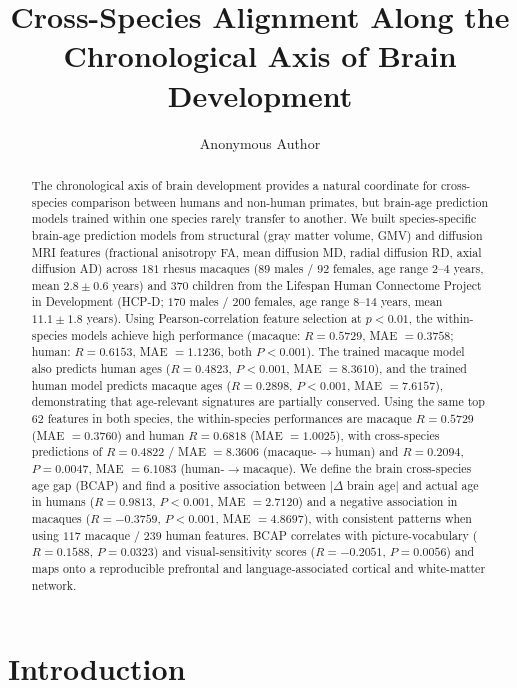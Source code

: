 \documentclass[11pt]{article}
\title{Cross-Species Alignment Along the Chronological Axis of Brain Development}
\author[1]{Anonymous Author}
\affil[1]{Anonymous Institution}
\date{}
\begin{document}
\maketitle

\begin{abstract}
The chronological axis of brain development provides a natural coordinate for cross-species comparison between humans and non-human primates, but brain-age prediction models trained within one species rarely transfer to another. We built species-specific brain-age prediction models from structural (gray matter volume, GMV) and diffusion MRI features (fractional anisotropy FA, mean diffusion MD, radial diffusion RD, axial diffusion AD) across $181$ rhesus macaques ($89$ males / $92$ females, age range $2$--$4$ years, mean $2.8 \pm 0.6$ years) and $370$ children from the Lifespan Human Connectome Project in Development (HCP-D; $170$ males / $200$ females, age range $8$--$14$ years, mean $11.1 \pm 1.8$ years). Using Pearson-correlation feature selection at $p < 0.01$, the within-species models achieve high performance (macaque: $R = 0.5729$, MAE $= 0.3758$; human: $R = 0.6153$, MAE $= 1.1236$, both $P < 0.001$). The trained macaque model also predicts human ages ($R = 0.4823$, $P < 0.001$, MAE $= 8.3610$), and the trained human model predicts macaque ages ($R = 0.2898$, $P < 0.001$, MAE $= 7.6157$), demonstrating that age-relevant signatures are partially conserved. Using the same top $62$ features in both species, the within-species performances are macaque $R = 0.5729$ (MAE $= 0.3760$) and human $R = 0.6818$ (MAE $= 1.0025$), with cross-species predictions of $R = 0.4822$ / MAE $= 8.3606$ (macaque-$\to$human) and $R = 0.2094$, $P = 0.0047$, MAE $= 6.1083$ (human-$\to$macaque). We define the brain cross-species age gap (BCAP) and find a positive association between $|\Delta$ brain age$|$ and actual age in humans ($R = 0.9813$, $P < 0.001$, MAE $= 2.7120$) and a negative association in macaques ($R = -0.3759$, $P < 0.001$, MAE $= 4.8697$), with consistent patterns when using $117$ macaque / $239$ human features. BCAP correlates with picture-vocabulary ($R = 0.1588$, $P = 0.0323$) and visual-sensitivity scores ($R = -0.2051$, $P = 0.0056$) and maps onto a reproducible prefrontal and language-associated cortical and white-matter network.
\end{abstract}

\section{Introduction}
\end{document}
